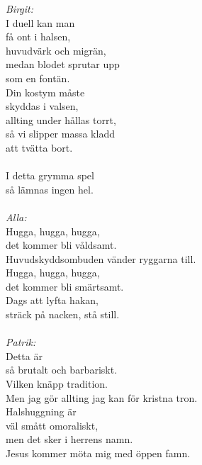 \documentclass[a6paper, 10pt, twoside]{article}
\begin{document}

\begin{center}
\end{center}
\begin{lyrics}
\vspace{-11pt}
\textit{Birgit:}\\
I duell kan man \\
få ont i halsen, \\
huvudvärk och migrän, \\
medan blodet sprutar upp \\
som en fontän. \\
Din kostym måste \\
skyddas i valsen, \\
allting under hållas torrt, \\
så vi slipper massa kladd\\
att tvätta bort.\\
\vspace{-4pt}\\
I detta grymma spel \\
så lämnas ingen hel. \\
\vspace{-4pt}\\
\textit{Alla:} \\
Hugga, hugga, hugga, \\
det kommer bli våldsamt. \\
Huvudskyddsombuden vänder ryggarna till. \\
Hugga, hugga, hugga, \\
det kommer bli smärtsamt. \\
Dags att lyfta hakan, \\
sträck på nacken, stå still. \\
\vspace{-4pt}\\
\textit{Patrik:} \\
Detta är \\
så brutalt och barbariskt. \\
Vilken knäpp tradition. \\
Men jag gör allting jag kan för kristna tron.\\
Halshuggning är \\
väl smått omoraliskt, \\
men det sker i herrens namn. \\
Jesus kommer möta mig med öppen famn.\\

\end{lyrics}
\end{document}
